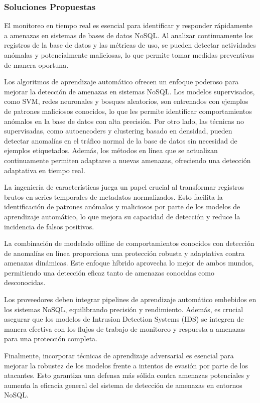 \documentclass[pdflatex,sn-mathphys-num]{sn-jnl}
\theoremstyle{thmstyleone}%
\theoremstyle{thmstyletwo}%
\theoremstyle{thmstylethree}%
\begin{document}
\subsubsection{Soluciones Propuestas}

El monitoreo en tiempo real es esencial para identificar y responder rápidamente a amenazas en sistemas de bases de datos NoSQL. Al analizar continuamente los registros de la base de datos y las métricas de uso, se pueden detectar actividades anómalas y potencialmente maliciosas, lo que permite tomar medidas preventivas de manera oportuna.

Los algoritmos de aprendizaje automático ofrecen un enfoque poderoso para mejorar la detección de amenazas en sistemas NoSQL. Los modelos supervisados, como SVM, redes neuronales y bosques aleatorios, son entrenados con ejemplos de patrones maliciosos conocidos, lo que les permite identificar comportamientos anómalos en la base de datos con alta precisión. Por otro lado, las técnicas no supervisadas, como autoencoders y clustering basado en densidad, pueden detectar anomalías en el tráfico normal de la base de datos sin necesidad de ejemplos etiquetados. Además, los métodos en línea que se actualizan continuamente permiten adaptarse a nuevas amenazas, ofreciendo una detección adaptativa en tiempo real.

La ingeniería de características juega un papel crucial al transformar registros brutos en series temporales de metadatos normalizados. Esto facilita la identificación de patrones anómalos y maliciosos por parte de los modelos de aprendizaje automático, lo que mejora su capacidad de detección y reduce la incidencia de falsos positivos.

La combinación de modelado offline de comportamientos conocidos con detección de anomalías en línea proporciona una protección robusta y adaptativa contra amenazas dinámicas. Este enfoque híbrido aprovecha lo mejor de ambos mundos, permitiendo una detección eficaz tanto de amenazas conocidas como desconocidas.

Los proveedores deben integrar pipelines de aprendizaje automático embebidos en los sistemas NoSQL, equilibrando precisión y rendimiento. Además, es crucial asegurar que los modelos de Intrusion Detection Systems (IDS) se integren de manera efectiva con los flujos de trabajo de monitoreo y respuesta a amenazas para una protección completa.

Finalmente, incorporar técnicas de aprendizaje adversarial es esencial para mejorar la robustez de los modelos frente a intentos de evasión por parte de los atacantes. Esto garantiza una defensa más sólida contra amenazas potenciales y aumenta la eficacia general del sistema de detección de amenazas en entornos NoSQL.
\end{document}
